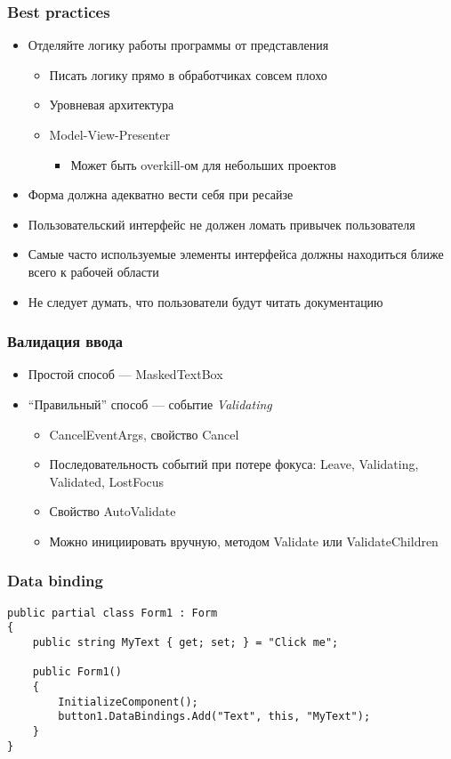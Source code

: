 \documentclass{../../slides-style}
\begin{document}
    \begin{frame}
        \frametitle{Best practices}
        \begin{itemize}
            \item Отделяйте логику работы программы от представления
            \begin{itemize}
                \item Писать логику прямо в обработчиках совсем плохо
                \item Уровневая архитектура
                \item Model-View-Presenter
                \begin{itemize}
                    \item Может быть overkill-ом для небольших проектов
                \end{itemize}
            \end{itemize}
            \item Форма должна адекватно вести себя при ресайзе
            \item Пользовательский интерфейс не должен ломать привычек пользователя
            \item Самые часто используемые элементы интерфейса должны находиться ближе всего к рабочей области
            \item Не следует думать, что пользователи будут читать документацию
        \end{itemize}
    \end{frame}

    \begin{frame}
        \frametitle{Валидация ввода}
        \begin{itemize}
            \item Простой способ --- MaskedTextBox
            \item ``Правильный'' способ --- событие \textit{Validating}
            \begin{itemize}
                \item CancelEventArgs, свойство Cancel
                \item Последовательность событий при потере фокуса: Leave, Validating, Validated, LostFocus
                \item Свойство AutoValidate
                \item Можно инициировать вручную, методом Validate или ValidateChildren
            \end{itemize}
        \end{itemize}
    \end{frame}

    \begin{frame}[fragile]
        \frametitle{Data binding}
        \begin{verbatim}
public partial class Form1 : Form
{
    public string MyText { get; set; } = "Click me";

    public Form1()
    {
        InitializeComponent();
        button1.DataBindings.Add("Text", this, "MyText");
    }
}
        \end{verbatim}
    \end{frame}
\end{document}
